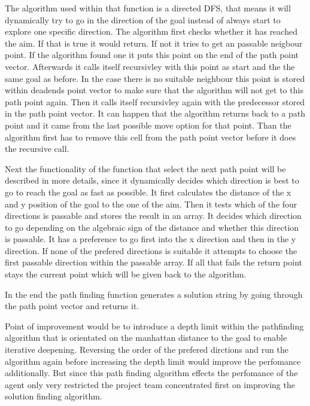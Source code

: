 \documentclass[a4paper,10pt]{article}
\begin{document}
The algorithm used within that function is a directed DFS, 
that means it will dynamically try to go in the direction of the goal instead of always start to explore one specific direction. 
The algorithm first checks whether it has reached the aim. If that is true it would return. 
If not it tries to get an passable neigbour point. If the algorithm found one it puts this point on the end of the path point vector. 
Afterwards it calls itself recursivley with this point as start and the the same goal as before.
In the case there is no suitable neighbour this point is stored within deadends 
point vector to make sure that the algorithm will not get to this path point again. 
Then it calls itself recursivley again with the predecessor stored in the path point vector. 
It can happen that the algorithm returns back to a path point and it came from the last possible move option for that point. 
Than the algorithm first has to remove this cell from the path point vector before it does the recursive call.

Next the functionality of the function that select the next path point will be described in more details, 
since it dynamically decides which direction is best to go to reach the goal as fast as possible. 
It first calculates the distance of the x and y position of the goal to the one of the aim. 
Then it tests which of the four directions is passable and stores the result in an array. 
It decides which direction to go depending on the algebraic sign of the distance and whether this direction is passable. 
It has a preference to go first into the x direction and then in the y direction. 
If none of the prefered directions is suitable it attempts to choose the first passable direction within the passable array. 
If all that fails the return point stays the current point which will be given back to the algorithm.

In the end the path finding function generates a solution string by going through the path point vector and returns it.

Point of improvement would be to introduce a depth limit within the pathfinding algorithm that is orientated on the manhattan distance to the goal to enable iterative deepening. 
Reversing the order of the prefered dirctions and run the algorithm again before increasing the depth limit would improve the perfomance additionally. 
But since this path finding algorithm effects the perfomance of the agent only very restricted the project team concentrated first on improving
the solution finding algorithm.
\end{document}
